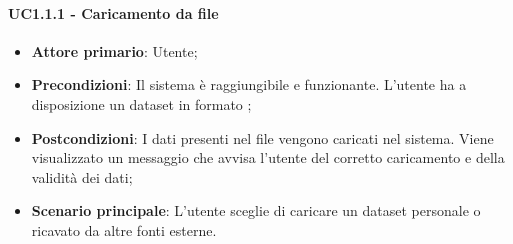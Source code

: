 \paragraph{UC1.1.1 - Caricamento da file}
\begin{itemize}
	\item \textbf{Attore primario}: Utente;
	\item \textbf{Precondizioni}: Il sistema è raggiungibile e funzionante. L'utente ha a disposizione un dataset in formato ;
	\item \textbf{Postcondizioni}: I dati presenti nel file vengono caricati nel sistema. Viene visualizzato un messaggio che avvisa l'utente del corretto caricamento e della validità dei dati;
	\item \textbf{Scenario principale}: L'utente sceglie di caricare un dataset personale o ricavato da altre fonti esterne.
	
\end{itemize}